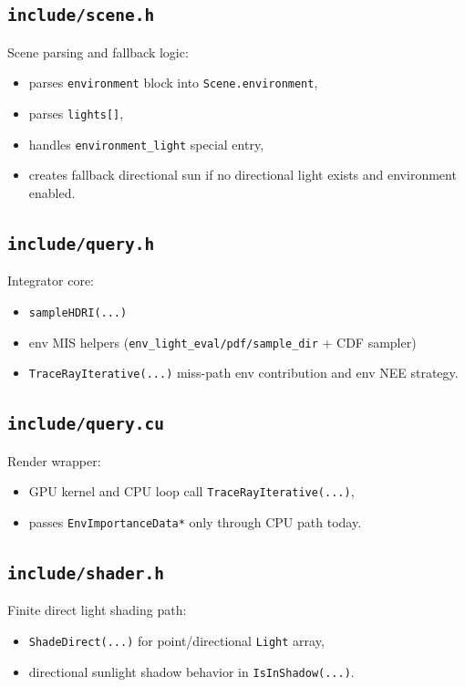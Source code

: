 \documentclass[11pt]{article}
\begin{document}
\subsection{\texttt{include/scene.h}}
Scene parsing and fallback logic:
\begin{itemize}[leftmargin=1.5em]
  \item parses \verb|environment| block into \verb|Scene.environment|,
  \item parses \verb|lights[]|,
  \item handles \verb|environment_light| special entry,
  \item creates fallback directional sun if no directional light exists and environment enabled.
\end{itemize}

\subsection{\texttt{include/query.h}}
Integrator core:
\begin{itemize}[leftmargin=1.5em]
  \item \verb|sampleHDRI(...)|
  \item env MIS helpers (\verb|env_light_eval/pdf/sample_dir| + CDF sampler)
  \item \verb|TraceRayIterative(...)| miss-path env contribution and env NEE strategy.
\end{itemize}

\subsection{\texttt{include/query.cu}}
Render wrapper:
\begin{itemize}[leftmargin=1.5em]
  \item GPU kernel and CPU loop call \verb|TraceRayIterative(...)|,
  \item passes \verb|EnvImportanceData*| only through CPU path today.
\end{itemize}

\subsection{\texttt{include/shader.h}}
Finite direct light shading path:
\begin{itemize}[leftmargin=1.5em]
  \item \verb|ShadeDirect(...)| for point/directional \verb|Light| array,
  \item directional sunlight shadow behavior in \verb|IsInShadow(...)|.
\end{itemize}
\end{document}
